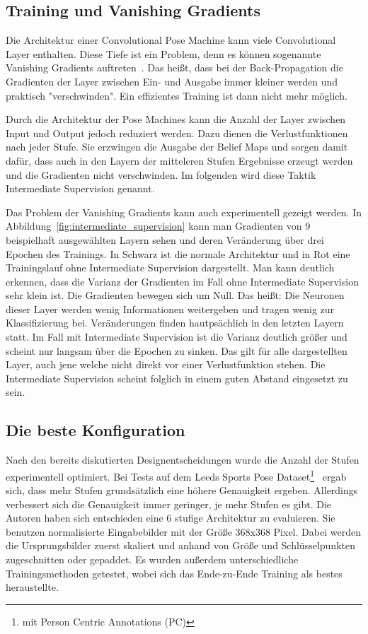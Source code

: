 \documentclass[journal, a4paper]{IEEEtran}
\begin{document}
\subsection{Training und Vanishing Gradients} \label{subsec:vanishing_gradients}

        Die Architektur einer Convolutional Pose Machine kann viele Convolutional Layer enthalten. Diese Tiefe ist ein Problem, denn es können sogenannte Vanishing Gradients auftreten~\cite{pascanu2013difficulty}. Das heißt, dass bei der Back-Propagation die Gradienten der Layer zwischen Ein- und Ausgabe immer kleiner werden und praktisch "verschwinden". Ein effizientes Training ist dann nicht mehr möglich.

        Durch die Architektur der Pose Machines kann die Anzahl der Layer zwischen Input und Output jedoch reduziert werden. Dazu dienen die Verlustfunktionen nach jeder Stufe. Sie erzwingen die Ausgabe der Belief Maps und sorgen damit dafür, dass auch in den Layern der mitteleren Stufen Ergebnisse erzeugt werden und die Gradienten nicht verschwinden. Im folgenden wird diese Taktik Intermediate Supervision genannt.

        Das Problem der Vanishing Gradients kann auch experimentell gezeigt werden. In Abbildung~\ref{fig:intermediate_supervision} kann man Gradienten von 9 beispielhaft ausgewählten Layern sehen und deren Veränderung über drei Epochen des Trainings. In Schwarz ist die normale Architektur und in Rot eine Trainingslauf ohne Intermediate Supervision dargestellt. Man kann deutlich erkennen, dass die Varianz der Gradienten im Fall ohne Intermediate Supervision sehr klein ist. Die Gradienten bewegen sich um Null. Das heißt: Die Neuronen dieser Layer werden wenig Informationen weitergeben und tragen wenig zur Klassifizierung bei. Veränderungen finden hautpsächlich in den letzten Layern statt. Im Fall mit Intermediate Supervision ist die Varianz deutlich größer und scheint nur langsam über die Epochen zu sinken. Das gilt für alle dargestellten Layer, auch jene welche nicht direkt vor einer Verlustfunktion stehen. Die Intermediate Supervision scheint folglich in einem guten Abstand eingesetzt zu sein.

\subsection{Die beste Konfiguration}
        
        Nach den bereits diskutierten Designentscheidungen wurde die Anzahl der Stufen experimentell optimiert. Bei Tests auf dem Leeds Sports Pose Dataset\footnote{mit Person Centric Annotations (PC)}~\cite{LSP} ergab sich, dass mehr Stufen grundsätzlich eine höhere Genauigkeit ergeben. Allerdings verbessert sich die Genauigkeit immer geringer, je mehr Stufen es gibt. Die Autoren haben sich entschieden eine 6 stufige Architektur zu evaluieren. Sie benutzen normalisierte Eingabebilder mit der Größe 368x368 Pixel. Dabei werden die Ursprungsbilder zuerst skaliert und anhand von Größe und Schlüsselpunkten zugeschnitten oder gepaddet. Es wurden außerdem unterschiedliche Trainingsmethoden getestet, wobei sich das Ende-zu-Ende Training als bestes heraustellte.
\end{document}

